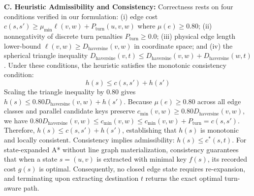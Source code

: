 \documentclass[conference]{IEEEtran}
\begin{document}
\noindent\textbf{C. Heuristic Admissibility and Consistency:} Correctness rests on four conditions verified in our formulation: (i) edge cost $c(s,s') \ge \mu_{\min} \ell(v,w) + P_{\text{turn}}(u,v,w)$ where $\mu(e) \ge 0.80$; (ii) nonnegativity of discrete turn penalties $P_{\text{turn}} \ge 0.0$; (iii) physical edge length lower-bound $\ell(v,w) \ge D_{\text{haversine}}(v,w)$ in coordinate space; and (iv) the spherical triangle inequality $D_{\text{haversine}}(v, t) \le D_{\text{haversine}}(v, w) + D_{\text{haversine}}(w, t)$. Under these conditions, the heuristic satisfies the monotonic consistency condition:
\begin{equation}
\label{eq:consistency_condition}
h(s) \le c(s,s') + h(s')
\end{equation}
Scaling the triangle inequality by $0.80$ gives $h(s) \le 0.80 D_{\text{haversine}}(v,w) + h(s')$. Because $\mu(e) \ge 0.80$ across all edge classes and parallel candidate keys preserve $c_{\min}(v,w) \ge 0.80 D_{\text{haversine}}(v,w)$, we have $0.80 D_{\text{haversine}}(v,w) \le c_{\min}(v,w) \le c_{\min}(v,w) + P_{\text{turn}} = c(s,s')$. Therefore, $h(s) \le c(s,s') + h(s')$, establishing that $h(s)$ is monotonic and locally consistent. Consistency implies admissibility: $h(s) \le c^*(s, t)$. For state-expanded A* without line graph materialization, consistency guarantees that when a state $s=(u,v)$ is extracted with minimal key $f(s)$, its recorded cost $g(s)$ is optimal. Consequently, no closed edge state requires re-expansion, and terminating upon extracting destination $t$ returns the exact optimal turn-aware path.
\end{document}
